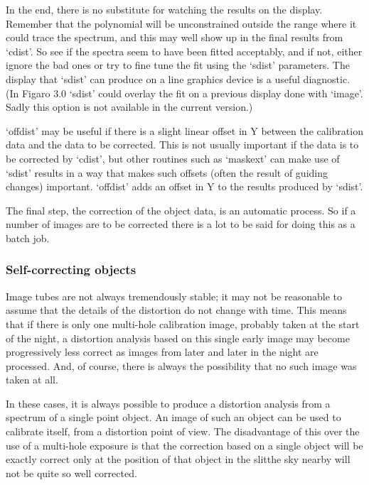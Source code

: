    In the end, there is no substitute for watching the results on the
   display. Remember that the polynomial will be unconstrained outside
   the range where it could trace the spectrum, and this may well show
   up in the final results from `cdist'.  So see if the spectra seem to
   have been fitted acceptably, and if not, either ignore the bad ones
   or try to fine tune the fit using the `sdist' parameters.  The
   display that `sdist' can produce on a line graphics device is a
   useful diagnostic. (In Figaro 3.0 `sdist' could overlay the fit on a
   previous display done with `image'. Sadly this option is not
   available in the current version.)

   `offdist' may be useful if there is a slight linear offset in Y
   between the calibration data and the data to be corrected.  This is
   not usually important if the data is to be corrected by `cdist', but
   other routines such as `maskext' can make use of `sdist' results in a
   way that makes such offsets (often the result of guiding changes)
   important.  `offdist' adds an offset in Y to the results produced by
   `sdist'.

   The final step, the correction of the object data, is an automatic
   process.  So if a number of images are to be corrected there is a lot
   to be said for doing this as a batch job.


\subsubsection{\label{techno7self}Self-correcting objects}

   Image tubes are not always tremendously stable; it may not be
   reasonable to assume that the details of the distortion do not change
   with time.  This means that if there is only one multi-hole
   calibration image, probably taken at the start of the night, a
   distortion analysis based on this single early image may become
   progressively less correct as images from later and later in the
   night are processed.  And, of course, there is always the possibility
   that no such image was taken at all.

   In these cases, it is always possible to produce a distortion
   analysis from a spectrum of a single point object.  An image of such
   an object can be used to calibrate itself, from a distortion point of
   view.  The disadvantage of this over the use of a multi-hole exposure
   is that the correction based on a single object will be exactly
   correct only at the position of that object in the
   slit\latorhtm{---}{-}the sky
   nearby will not be quite so well corrected.

